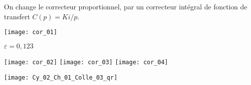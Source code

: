 \ifprof
\begin{corrige}
\end{corrige}
\else
\fi

On change le correcteur proportionnel, par un correcteur intégral de fonction de transfert $C(p)=Ki/p$.
\ifprof
\begin{corrige}
\end{corrige}
\else
\fi



\ifprof


\begin{center}
	\texttt{[image: cor\_01]}
	
	$\varepsilon = 0,123$
	
	\texttt{[image: cor\_02]}
	\texttt{[image: cor\_03]}
	\texttt{[image: cor\_04]}
\end{center}



%
\else
\fi



\ifprof
\else
\begin{marginfigure}[-3cm]
\centering
\texttt{[image: Cy\_02\_Ch\_01\_Colle\_03\_qr]}
\end{marginfigure}
\fi
